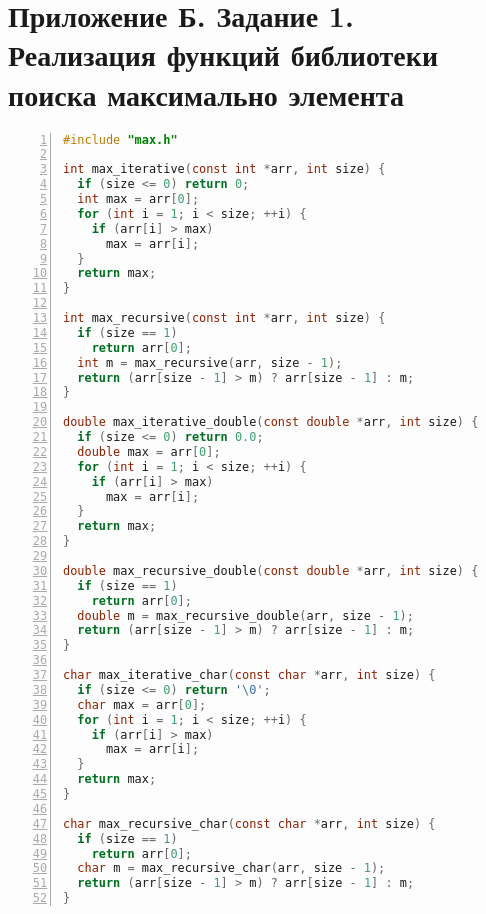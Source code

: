 \section*{Приложение Б. Задание 1. Реализация функций библиотеки поиска максимально элемента}

\begin{lstlisting}[language=C,numbers=left]
#include "max.h"

int max_iterative(const int *arr, int size) {
  if (size <= 0) return 0;
  int max = arr[0];
  for (int i = 1; i < size; ++i) {
    if (arr[i] > max)
      max = arr[i];
  }
  return max;
}

int max_recursive(const int *arr, int size) {
  if (size == 1)
    return arr[0];
  int m = max_recursive(arr, size - 1);
  return (arr[size - 1] > m) ? arr[size - 1] : m;
}

double max_iterative_double(const double *arr, int size) {
  if (size <= 0) return 0.0;
  double max = arr[0];
  for (int i = 1; i < size; ++i) {
    if (arr[i] > max)
      max = arr[i];
  }
  return max;
}

double max_recursive_double(const double *arr, int size) {
  if (size == 1)
    return arr[0];
  double m = max_recursive_double(arr, size - 1);
  return (arr[size - 1] > m) ? arr[size - 1] : m;
}

char max_iterative_char(const char *arr, int size) {
  if (size <= 0) return '\0';
  char max = arr[0];
  for (int i = 1; i < size; ++i) {
    if (arr[i] > max)
      max = arr[i];
  }
  return max;
}

char max_recursive_char(const char *arr, int size) {
  if (size == 1)
    return arr[0];
  char m = max_recursive_char(arr, size - 1);
  return (arr[size - 1] > m) ? arr[size - 1] : m;
}
\end{lstlisting}